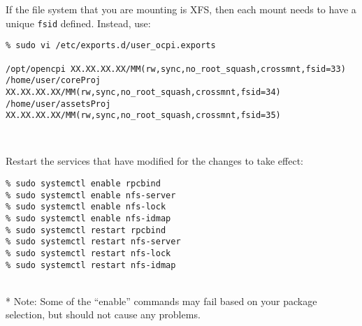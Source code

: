 \begin{minipage}{\linewidth}
If the file system that you are mounting is XFS, then each mount needs to have a unique \texttt{fsid} defined. Instead, use:
\begin{verbatim}
% sudo vi /etc/exports.d/user_ocpi.exports

/opt/opencpi XX.XX.XX.XX/MM(rw,sync,no_root_squash,crossmnt,fsid=33)
/home/user/coreProj XX.XX.XX.XX/MM(rw,sync,no_root_squash,crossmnt,fsid=34)
/home/user/assetsProj XX.XX.XX.XX/MM(rw,sync,no_root_squash,crossmnt,fsid=35)
\end{verbatim}
\end{minipage}
~\\

\begin{minipage}{\linewidth}
Restart the services that have modified for the changes to take effect:
\begin{verbatim}
% sudo systemctl enable rpcbind
% sudo systemctl enable nfs-server
% sudo systemctl enable nfs-lock
% sudo systemctl enable nfs-idmap
% sudo systemctl restart rpcbind
% sudo systemctl restart nfs-server
% sudo systemctl restart nfs-lock
% sudo systemctl restart nfs-idmap
\end{verbatim}
\end{minipage}
~\\

* Note: Some of the ``enable'' commands may fail based on your package selection, but should not cause any problems.
\setlength{\parindent}{\savedparindentnfs}%
